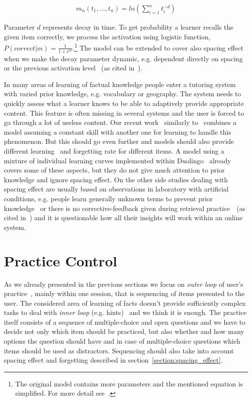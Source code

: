 \documentclass[table,color,cover,twoside,nolot,nolof]{fithesis3/fithesis3}
\begin{document}
\begin{align}
m_n(t_1, \ldots, t_n) = ln\left(\sum_{i=1}^n t_i^{-d}\right)
\end{align}

Parameter $d$ represents decay in time. To get probability a learner recalls
the given item correctly, we process the activation using logistic function,
$P(correct|m) = \frac{1}{1 + e^{m}}$.\footnote{The original model contains more
parameters and the mentioned equation is simplified. For more detail
see~\cite{pavlik2005practice}.} The model can be extended to cover also spacing
effect when we make the decay parameter dynamic, e.g. dependent directly on
spacing or the previous activation level~\cite{anderson1991reflections} (as
cited in~\cite{pavlik2005practice}).

\bigskip

\noindent
In many areas of learning of factual knowledge people enter a tutoring system
with varied prior knowledge, e.g. vocabulary or geography. The system needs to
quickly assess what a learner knows to be able to adaptively provide appropriate
content. This feature is often missing in several systems and the user is
forced to go through a lot of useless content. Our recent
work~\cite{papousek2014adaptive} similarly to~\cite{khajah2014integrating}
combines a model assuming a constant skill with another one for learning to
handle this phenomenon.  But this should go even further and models should also
provide different learning~\cite{pelanek2015modeling} and forgetting rate for
different items.  A model using a mixture of individual learning curves
implemented within Duolingo~\cite{streeter2015mixture} already covers some of
these aspects, but they do not give much attention to prior knowledge and
ignore spacing effect.  On the other side studies dealing with spacing effect
are usually based on observations in laboratory with artificial conditions, e.g.
people learn generally unknown terms to prevent prior
knowledge~\cite{kang2014retrieval} or there is no corrective-feedback given
during retrieval practice~\cite{landauer1978optimum}~(as cited
in~\cite{kang2014retrieval}) and it is questionable how all their insights will
work within an online system.

\section{Practice Control}
\label{section:practice_control}

As we already presented in the previous sections we focus on \emph{outer loop}
of user's practice~\cite{vanlehn2006behavior}, mainly within one session, that
is sequencing of items presented to the user. The considered area of learning
of facts doesn't provide sufficiently complex tasks to deal with \emph{inner
loop} (e.g. hints)~\cite{vanlehn2006behavior} and we think it is enough. The
practice itself consists of a sequence of multiple-choice and open
questions and we have to decide not only which item should be practiced, but
also whether and how many options the question should have and in case of
multiple-choice questions which items should be used as distractors. Sequencing
should also take into account spacing effect and forgetting described in
section~\ref{section:spacing_effect}.
\end{document}
